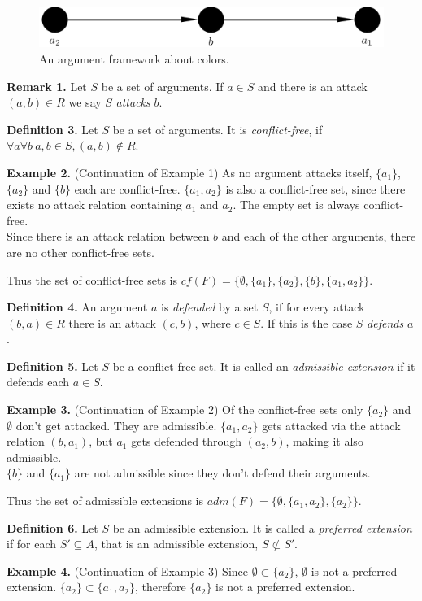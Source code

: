\documentclass[draft,final]{vutinfth} %
\newcommand{\hl}{\par\medskip\noindent}
\newcommand{\dl}{\par\bigskip\noindent}
\begin{document}
\FloatBarrier
	\begin{figure}[!htb]
		\centering
		\includegraphics[width=\linewidth]{graphs/ex1.png} %
		\caption{An argument framework about colors.}
	\end{figure}
\FloatBarrier

\noindent
\textbf{Remark 1.} Let $S$ be a set of arguments. If $a\in S$ and there is an attack $(a,b)\in R$ we say $S$ \emph{attacks} $b$.\dl
\textbf{Definition 3.} Let $S$ be a set of arguments. It is \emph{conflict-free}, if $\forall a \forall b\ a,b\in S, (a,b)\notin R$.\dl
\textbf{Example 2.} (Continuation of Example 1) As no argument attacks itself, $\{a_1\}$, $\{a_2\}$ and $\{b\}$ each are conflict-free. $\{a_1,a_2\}$ is also a conflict-free set, since there exists no attack relation containing $a_1$ and $a_2$. The empty set is always conflict-free.\\
Since there is an attack relation between $b$ and each of the other arguments, there are no other conflict-free sets.\hl
Thus the set of conflict-free sets is $cf(F)=\{\emptyset,\{a_1\},\{a_2\},\{b\},\{a_1,a_2\}\}$.\dl
\textbf{Definition 4.} An argument $a$ is \emph{defended} by a set $S$, if for every attack $(b,a)\in R$ there is an attack $(c,b)$, where $c\in S$. If this is the case $S$ \emph{defends} $a$.\dl
\textbf{Definition 5.} Let $S$ be a conflict-free set. It is called an \emph{admissible extension} if it defends each $a\in S$.\dl
\textbf{Example 3.} (Continuation of Example 2) Of the conflict-free sets only $\{a_2\}$ and \(\emptyset\) don't get attacked. They are admissible. $\{a_1,a_2\}$ gets attacked via the attack relation $(b,a_1)$, but $a_1$ gets defended through $(a_2,b)$, making it also admissible.\\
$\{b\}$ and $\{a_1\}$ are not admissible since they don't defend their arguments.\hl
Thus the set of admissible extensions is $adm(F)=\{\emptyset,\{a_1,a_2\},\{a_2\}\}$.\dl
\textbf{Definition 6.} Let $S$ be an admissible extension. It is called a \emph{preferred extension} if for each $S'\subseteq A$, that is an admissible extension, $S\not\subset S'$.\dl
\textbf{Example 4.} (Continuation of Example 3) Since $\emptyset\subset\{a_2\}$, \(\emptyset\) is not a preferred extension. $\{a_2\}\subset\{a_1,a_2\}$, therefore $\{a_2\}$ is not a preferred extension.\\
\end{document}
